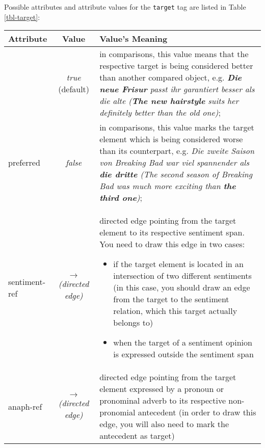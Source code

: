 \documentclass[11pt,a4paper]{article}
\newlength\clmnwidth
\begin{document}
Possible attributes and attribute values for the \texttt{target} tag are
listed in Table \ref{tbl-target}:
\begin{center}
  \begin{tabular}{|l|c|p{\clmnwidth}|}\hline
    Attribute & Value & Value's Meaning\\\hline\label{tbl-target}

    & \textit{true} (default) & in comparisons, this value means that the
    respective target is being considered better than another compared object,
    e.g. \textit{\textbf{Die neue Frisur} passt ihr garantiert besser als die
      alte (\textbf{The new hairstyle} suits her definitely better than the
      old one)};\\\cline{2-3}

    \multirow{-2}{*}{preferred} & \textit{false} & in
    comparisons, this value marks the target element which is being
    considered worse than its counterpart, e.g. \textit{Die zweite
      Saison von Breaking Bad war viel spannender als \textbf{die
        dritte} (The second season of Breaking Bad was much more
      exciting than \textbf{the third one})};\\\hline

    sentiment-ref & \textit{$\longrightarrow$\newline(directed edge)} &
    directed edge pointing from the target element to its respective sentiment
    span.  You need to draw this edge in two cases:
    \begin{itemize}
    \item if the target element is located in an intersection of two different
      sentiments (in this case, you should draw an edge from the target to the
      sentiment relation, which this target actually belongs to)

    \item when the target of a sentiment opinion is expressed outside the
      sentiment span
    \end{itemize}\\\hline

    anaph-ref & \textit{$\longrightarrow$\newline(directed edge)} & directed
    edge pointing from the target element expressed by a pronoun or pronominal
    adverb to its respective non-pronomial antecedent (in order to draw this
    edge, you will also need to mark the antecedent as target)\\\hline
  \end{tabular}
\end{center}
\end{document}
